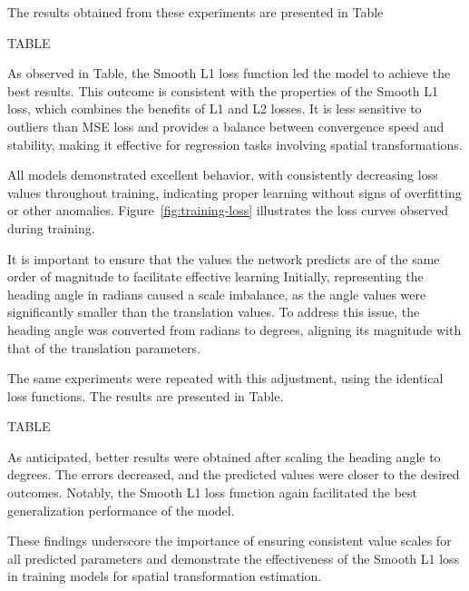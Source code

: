 The results obtained from these experiments are presented in Table

TABLE

As observed in Table, the Smooth L1 loss function led the model to achieve the best results. This outcome is consistent with the properties of the Smooth L1 loss, which combines the benefits of L1 and L2 losses. It is less sensitive to outliers than MSE loss and provides a balance between convergence speed and stability, making it effective for regression tasks involving spatial transformations.

All models demonstrated excellent behavior, with consistently decreasing loss values throughout training, indicating proper learning without signs of overfitting or other anomalies. Figure~\ref{fig:training-loss} illustrates the loss curves observed during training.

It is important to ensure that the values the network predicts are of the same order of magnitude to facilitate effective learning 
Initially, representing the heading angle in radians caused a scale imbalance, as the angle values were significantly smaller than the translation values. To address this issue, the heading angle was converted from radians to degrees, aligning its magnitude with that of the translation parameters.

The same experiments were repeated with this adjustment, using the identical loss functions. The results are presented in Table.

TABLE

As anticipated, better results were obtained after scaling the heading angle to degrees. The errors decreased, and the predicted values were closer to the desired outcomes. Notably, the Smooth L1 loss function again facilitated the best generalization performance of the model.


These findings underscore the importance of ensuring consistent value scales for all predicted parameters and demonstrate the effectiveness of the Smooth L1 loss in training models for spatial transformation estimation.

